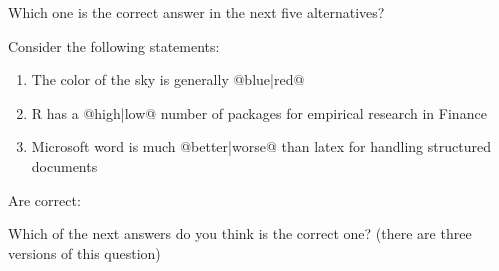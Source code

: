 \documentclass[10pt]{examdesign}
\begin{document}
\vspace{1cm}

\begin{multiplechoice}[resetcounter=no,  examcolumns=1]

\begin{question}

	Which one is the correct answer in the next five alternatives?






\end{question}

\begin{question}

	Consider the following statements:

	\begin{enumerate}[I]
		\item The color of the sky is generally @{blue}|{red}@

		\item R has a @{high}|{low}@ number of packages for empirical research in Finance

		\item Microsoft word is much @{better}|{worse}@ than latex for handling structured documents
	\end{enumerate}

	Are correct:






\end{question}


\begin{question}

	Which of the next answers do you think is the correct one? (there are three versions of this question)





\end{question}
\end{multiplechoice}
\end{document}
